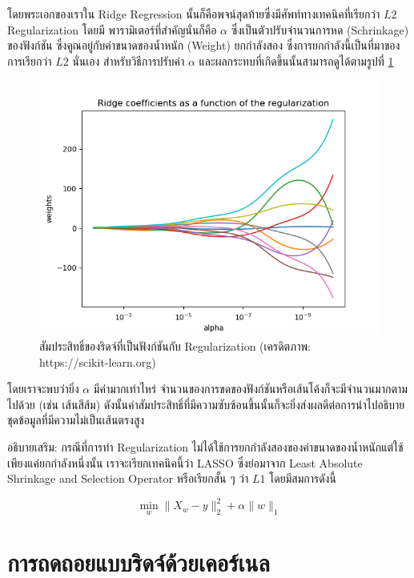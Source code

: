 \noindent โดยพระเอกของเราใน Ridge Regression นั้นก็คือพจน์สุดท้ายซึ่งมีศัพท์ทางเทคนิคที่เรียกว่า $L2$ Regularization โดยมี%
พารามิเตอร์ที่สำคัญนั่นก็คือ $\alpha$ ซึ่งเป็นตัวปรับจำนวนการหด (Schrinkage) ของฟังก์ชัน ซึ่งคูณอยู่กับค่าขนาดของน้ำหนัก (Weight)
ยกกำลังสอง ซึ่งการยกกำลังนี้เป็นที่มาของการเรียกว่า $L2$ นั่นเอง สำหรับวิธีการปรับค่า $\alpha$ และผลกระทบที่เกิดขึ้นนั้นสามารถดูได้ตามรูปที่
\ref{fig:ridge_res}

\begin{figure}[H]
    \centering
    \includegraphics[width=0.9\linewidth]{fig/plot_ridge_regression.png}
    \caption{สัมประสิทธิ์ของริดจ์ที่เป็นฟังก์ชันกับ Regularization (เครดิตภาพ: https://scikit-learn.org)}
    \label{fig:ridge_res}
\end{figure}

\noindent โดยเราจะพบว่ายิ่ง $\alpha$ มีค่ามากเท่าไหร่ จำนวนของการขดของฟังก์ชันหรือเส้นโค้งก็จะมีจำนวนมากตามไปด้วย (เช่น เส้นสีส้ม)
ดังนั้นค่าสัมประสิทธิ์ที่มีความซับซ้อนขึ้นนั้นก็จะยิ่งส่งผลดีต่อการนำไปอธิบายชุดข้อมูลที่มีความไม่เป็นเส้นตรงสูง

อธิบายเสริม: กรณีที่การทำ Regularization ไม่ได้ใช้การยกกำลังสองของค่าขนาดของน้ำหนักแต่ใช้เพียงแค่ยกกำลังหนึ่งนั้น เราจะเรียกเทคนิคนี้ว่า
LASSO ซึ่งย่อมาจาก Least Absolute Shrinkage and Selection Operator หรือเรียกสั้น ๆ ว่า $L1$ โดยมีสมการดังนี้

\begin{equation}
    \min_{w} \lVert X_{w} - y \rVert_{2}^{2} + \alpha \lVert w \rVert_{1}
\end{equation}

\section{การถดถอยแบบริดจ์ด้วยเคอร์เนล}
\label{sec:kernel_ridge}

